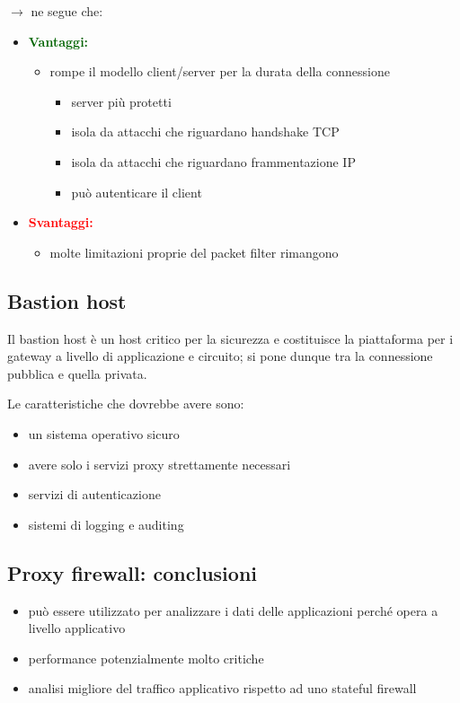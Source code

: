 \noindent $\rightarrow$ ne segue che:
\begin{itemize}
    \item \textcolor{darkgreen}{\textbf{Vantaggi:}}
    \begin{itemize}
        \item rompe il modello client/server per la durata della connessione 
        \begin{itemize}
            \item server più protetti 
            \item isola da attacchi che riguardano handshake TCP 
            \item isola da attacchi che riguardano frammentazione IP 
            \item può autenticare il client 
        \end{itemize}
    \end{itemize}
    \item \textcolor{red}{\textbf{Svantaggi:}}
    \begin{itemize}
        \item molte limitazioni proprie del packet filter rimangono
    \end{itemize}
\end{itemize}

\subsection{Bastion host}
Il bastion host è un host critico per la sicurezza e costituisce la piattaforma per i gateway 
a livello di applicazione e circuito; si pone dunque tra la connessione pubblica 
e quella privata.

\noindent Le caratteristiche che dovrebbe avere sono:
\begin{itemize}
    \item un sistema operativo sicuro 
    \item avere solo i servizi proxy strettamente necessari 
    \item servizi di autenticazione 
    \item sistemi di logging e auditing
\end{itemize}

\subsection{Proxy firewall: conclusioni}
\begin{itemize}
    \item può essere utilizzato per analizzare i dati delle applicazioni perché
    opera a livello applicativo 
    \item performance potenzialmente molto critiche 
    \item analisi migliore del traffico applicativo rispetto ad uno stateful firewall
\end{itemize}

